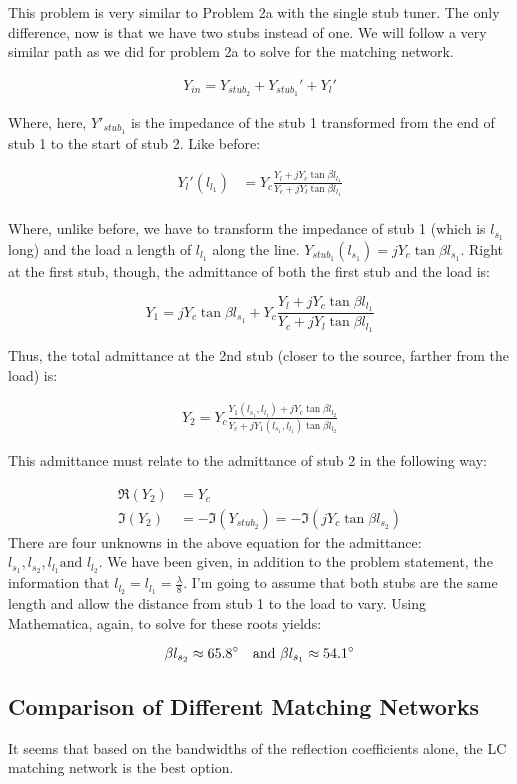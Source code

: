 This problem is very similar to Problem 2a with the single stub tuner. The only
difference, now is that we have two stubs instead of one. We will follow a very
similar path as we did for problem 2a to solve for the matching network.

\begin{align}
    Y_{in} = Y_{stub_2} + Y_{stub_1}' + Y_l'
\end{align}

Where, here, $Y'_{stub_1}$ is the impedance of the stub 1 transformed from the
end of stub 1 to the start of stub 2. Like before:

\begin{align*}
    Y_l'(l_{l_1}) &= Y_c \frac{Y_l + j Y_c \tan \beta l_{l_1}}{Y_c + j Y_l \tan
    \beta l_{l_1}} \\
\end{align*}

Where, unlike before, we have to transform the impedance of stub 1 (which is
$l_{s_1}$ long) and the load a length of $l_{l_1}$ along the line. $Y_{stub_1}(l_{s_1}) = j Y_c
\tan \beta l_{s_1}$. Right at the first stub, though, the admittance of both the
first stub and the load is:

\[ 
        Y_1 = j Y_c \tan \beta l_{s_1} + Y_c \frac{Y_l + j Y_c \tan \beta
        l_{l_1}}{Y_c + j Y_l \tan \beta l_{l_1}}
\]



Thus, the total admittance at the 2nd stub (closer to the source, farther from
the load) is:

\begin{align*}
    Y_2 =  Y_c \frac{Y_1(l_{s_1},l_{l_1}) + j Y_c \tan \beta l_{l_2}}{Y_c + j
        Y_1(l_{s_1},l_{l_1}) \tan \beta{l_{l_2}}}
\end{align*}


This admittance must relate to the admittance of stub 2 in the following way:

\begin{align*}
    \Re \left( Y_2 \right) &= Y_c \\
    \Im \left( Y_2 \right) &= -\Im \left( Y_{stub_2} \right) = - \Im \left( j
Y_c \tan \beta l_{s_2} \right)
\end{align*}
There are four unknowns in the above equation for the admittance: $l_{s_1}, l_{s_2},
l_{l_1} \text{and~} l_{l_2}$. We have been given, in addition to the problem
statement, the information that $l_{l_2} = l_{l_1} = \frac{\lambda}{8}$. I'm
going to assume that both stubs are the same length and allow the distance from
stub 1 to the load to vary. Using Mathematica, again, to solve for these roots
yields:

\[ 
        \beta l_{s_2} \approx 65.8 \degree \text{\quad and } \beta l_{s_1}
        \approx 54.1 \degree
\]

\subsection{Comparison of Different Matching Networks}

It seems that based on the bandwidths of the reflection coefficients alone, the
LC matching network is the best option.
